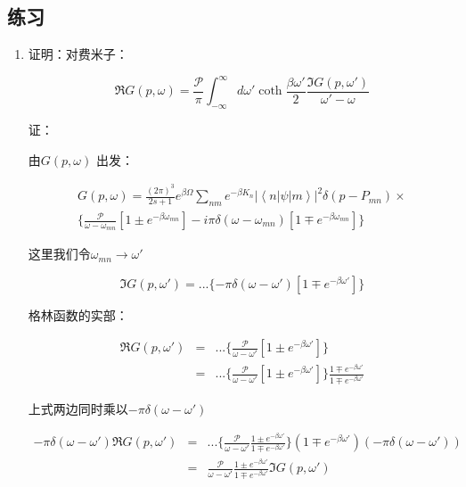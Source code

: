 \subsection*{练习}

\begin{enumerate}

\item 

证明：对费米子：

\begin{equation}
\Re G (p, \omega) = \frac{\mathcal{P}}{\pi} \int_{- \infty}^{ \infty} d \omega' \coth \frac{\beta \omega'}{2} \frac{\Im G (p, \omega' )}{\omega' - \omega}
\end{equation}

证：

由$G (p, \omega)$ 出发：

\begin{eqnarray*}
G(p,\omega) = \frac{(2\pi)^3}{2s+1} e^{\beta \Omega} \sum\limits_{nm} e^{-\beta K_n } \left| \left\langle n \right| \psi \left| m \right\rangle  \right|^2 \delta(p - P_{mn}) \times \\
\{ \frac{\mathcal{P}}{\omega - \omega_{mn}} \left[ 1 \pm e^{-\beta \omega_{mn}} \right] - i \pi \delta (\omega - \omega_{mn}) \left[ 1 \mp e^{- \beta \omega_{mn}}  \right]   \}
\end{eqnarray*}

这里我们令$\omega_{mn} \to \omega'$


\begin{equation*}
\Im G(p, \omega') = ... \{ - \pi \delta(\omega - \omega' ) \left[ 1 \mp e^{- \beta \omega'} \right]  \}
\end{equation*}

格林函数的实部：

\begin{eqnarray*}
\Re G (p, \omega') &=& ... \{ \frac{\mathcal{P}}{ \omega - \omega' } \left[ 1 \pm e^{- \beta \omega' }  \right]   \} \\
{} &=& ...  \{ \frac{\mathcal{P}}{ \omega - \omega' } \left[ 1 \pm e^{- \beta \omega' }  \right]   \}\frac{ 1 \mp e^{- \beta \omega'} }{ 1 \mp e^{-\beta \omega'}  }
\end{eqnarray*}

上式两边同时乘以$ - \pi \delta(\omega - \omega' )$

\begin{eqnarray*}
- \pi \delta(\omega - \omega' ) \Re G(p, \omega' ) &=& ... \{ \frac{\mathcal{P}}{\omega - \omega'} \frac{1 \pm e^{- \beta \omega'}}{1 \mp e^{ - \beta \omega' } }  \} (1 \mp e^{ - \beta \omega' }) (- \pi \delta(\omega - \omega' ) )\\
{} &=& \frac{\mathcal{P}}{ \omega - \omega' } \frac{1 \pm e^{ - \beta \omega' } }{1 \mp e^{ - \beta \omega' } } \Im G(p, \omega')
\end{eqnarray*}


\end{enumerate}
